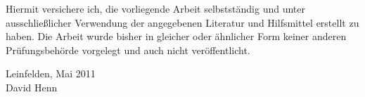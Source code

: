 Hiermit versichere ich, die vorliegende Arbeit selbstständig und unter ausschließlicher
Verwendung der angegebenen Literatur und Hilfsmittel erstellt zu haben.
Die Arbeit wurde bisher in gleicher oder ähnlicher Form keiner anderen Prüfungsbehörde
vorgelegt und auch nicht veröffentlicht.





\vspace{7cm}

Leinfelden, Mai 2011
\\David Henn
